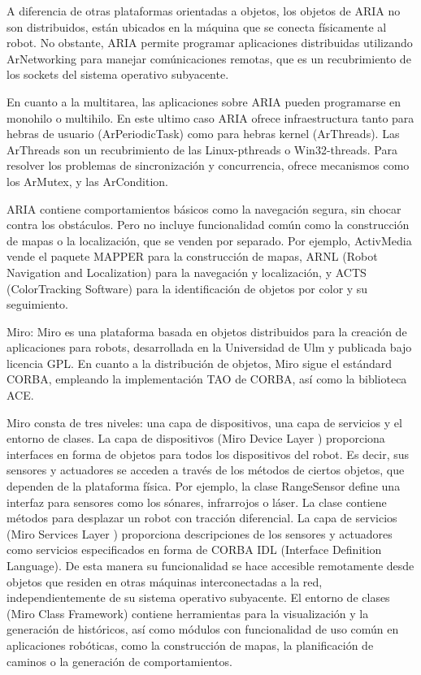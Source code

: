 \begin{itemize}
	A diferencia de otras plataformas orientadas a objetos, los objetos de ARIA no son distribuidos, están ubicados en la máquina que se conecta físicamente al robot. No obstante, ARIA permite programar aplicaciones distribuidas utilizando ArNetworking para manejar comúnicaciones remotas, que es un recubrimiento de los sockets del sistema operativo subyacente.

	En cuanto a la multitarea, las aplicaciones sobre ARIA pueden programarse en monohilo o multihilo. En este ultimo caso ARIA ofrece infraestructura tanto para hebras de usuario (ArPeriodicTask) como para hebras kernel (ArThreads). Las ArThreads son un recubrimiento de las Linux-pthreads o Win32-threads. Para resolver los problemas de sincronización y concurrencia, ofrece mecanismos como los ArMutex, y las ArCondition.

	ARIA contiene comportamientos básicos como la navegación segura, sin chocar contra los obstáculos. Pero no incluye funcionalidad común como la construcción de mapas o la localización, que se venden por separado. Por ejemplo, ActivMedia vende el paquete MAPPER para la construcción de mapas, ARNL (Robot Navigation and Localization) para la navegación y localización, y ACTS (ColorTracking Software) para la identificación de objetos por color y su seguimiento. 

	Miro: Miro es una plataforma basada en objetos distribuidos para la creación de aplicaciones para robots, desarrollada en la Universidad de Ulm y publicada bajo licencia GPL. En cuanto a la distribución de objetos, Miro sigue el estándard CORBA, empleando la implementación TAO de CORBA, así como la biblioteca ACE.

	Miro consta de tres niveles: una capa de dispositivos, una capa de servicios y el entorno de clases. La capa de dispositivos (Miro Device Layer ) proporciona interfaces en forma de objetos para todos los dispositivos del robot. Es decir, sus sensores y actuadores se acceden a través de los métodos de ciertos objetos, que dependen de la plataforma física. Por ejemplo, la clase RangeSensor define una interfaz para sensores como los sónares, infrarrojos o láser. La clase contiene métodos para desplazar un robot con tracción diferencial. La capa de servicios (Miro Services Layer ) proporciona descripciones de los sensores y actuadores como servicios especificados en forma de CORBA IDL (Interface Definition Language). De esta manera su funcionalidad se hace accesible remotamente desde objetos que residen en otras máquinas interconectadas a la red, independientemente de su sistema operativo subyacente. El entorno de clases (Miro Class Framework) contiene herramientas para la visualización y la generación de históricos, así como módulos con funcionalidad de uso común en aplicaciones robóticas, como la construcción de mapas, la planificación de caminos o la generación de comportamientos.


\end{itemize}
